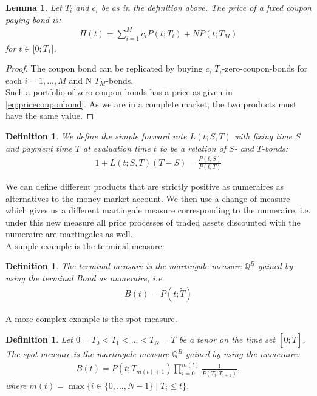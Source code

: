 \documentclass[12pt]{article}
\newtheorem{lemma}[theorem]{Lemma}
\newtheorem{definition}[theorem]{Definition}
\begin{document}
	\begin{lemma}
		Let $T_i$ and $c_i$ be as in the definition above. 
		The price of a fixed coupon paying bond is:
		\begin{align}\label{eq:pricecouponbond}
			\Pi(t)=\sum_{i=1}^{M}c_i P(t;T_i) + NP(t;T_M)
		\end{align}
		for $t\in [0;T_1[$.
	\end{lemma}
	\begin{proof}
		The coupon bond can be replicated by buying $c_i$ $T_i$-zero-coupon-bonds for each $i=1, ..., M$ and N $T_M$-bonds.\\
		Such a portfolio of zero coupon bonds has a price as given in \cref{eq:pricecouponbond}. As we are in a complete market, the two products must have the same value.
	\end{proof}
	\begin{definition}\label{def:simpleFR}
		We define the \emph{simple forward rate} $L(t;S,T)$ with fixing time $S$ and payment time $T$ at evaluation time $t$ to be a relation of $S$- and $T$-bonds:
		\begin{align}
			1 + L(t;S,T)(T - S) = \frac{P(t;S)}{P(t;T)}
		\end{align}
	\end{definition}
	We can define different products that are strictly positive as numeraires as alternatives to the money market account. We then use a change of measure which gives us a different martingale measure corresponding to the numeraire, i.e. under this new measure all price processes of traded assets discounted with the numeraire are martingales as well.\\
	A simple example is the terminal measure:
	\begin{definition}
		The \emph{terminal measure} is the martingale measure $\mathbb{Q}^B$ gained by using the terminal Bond as numeraire, i.e. 
		\begin{align}\label{eq:terminalNumeraire}
			B(t) = P(t;\tilde{T})
		\end{align}
	\end{definition}
	A more complex example is the spot measure.
	\begin{definition}
		Let $0 = T_0 < T_1 < ... < T_N = \tilde{T}$ be a tenor on the time set $[0;\tilde{T}]$.\\
		The \emph{spot measure} is the martingale measure $\mathbb{Q}^B$ gained by using the numeraire:
		\begin{align}\label{eq:spotNumeraire}
			B(t) = P(t;T_{m(t)+1})\prod_{i=0}^{m(t)}\frac{1}{P(T_{i};T_{i+1})},
		\end{align}
		where $m(t) = \max\{i \in \{0, ..., N-1\} \; | \; T_i \le t \}$.
	\end{definition}
\end{document}
